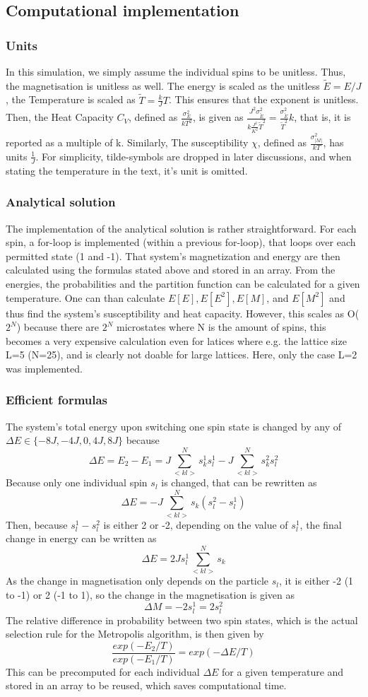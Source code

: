 \documentclass[10pt,a4paper]{article}
\begin{document}
\subsection{Computational implementation}

\subsubsection{Units}
In this simulation, we simply assume the individual spins to be unitless. Thus, the magnetisation is unitless as well.
The energy is scaled as the unitless $\tilde{E}=E/J$, the Temperature is scaled as  $\tilde{T}=\frac{k}{J}T$. This ensures that the exponent is unitless.
Then, the Heat Capacity $C_V$, defined as $\frac{\sigma_E^2}{kT^2}$, is given as $\frac{J^2\sigma^2_{\tilde{E}}}{k\frac{J^2}{K^2} \tilde{T}^2}=\frac{\sigma^2_{\tilde{E}}}{\tilde{T}^2}k$, that is, it is reported as a multiple of k. 
Similarly, The susceptibility $\chi$, defined as $\frac{\sigma_{|M|}^2}{kT}$, has units $\frac{1}{J}$. For simplicity, tilde-symbols are dropped in later discussions, and when stating the temperature in the text, it's unit is omitted.
\subsubsection{Analytical solution}
The implementation of the analytical solution is rather straightforward. For each spin, a for-loop is implemented (within a previous for-loop), that loops over each permitted state (1 and -1). That system's magnetization and energy are then calculated using the formulas stated above and stored in an array. From the energies, the probabilities and the partition function can be calculated for a given temperature. One can than calculate $E[E],E[E^2],E[M]$, and $E[M^2]$ and thus find the system's susceptibility and heat capacity. However, this scales as O($2^N$) because there are  $2^N$ microstates where N is the amount of spins, this becomes a very expensive calculation even for latices where e.g. the lattice size L=5 (N=25), and is clearly not doable for large lattices. Here, only the case L=2 was implemented.
\subsubsection{Efficient formulas}
The system's total energy upon switching one spin state is changed by any of $\Delta E \in \{-8J,-4J,0,4J,8J\}$ because 
$$\Delta E=E_2-E_1=J\sum_{<kl>}^Ns_k^1s_l^1-J\sum_{<kl>}^Ns_k^2s_l^2$$
Because only one individual spin $s_l$ is changed, that can be rewritten as 
$$\Delta E=-J\sum_{<kl>}^Ns_k(s_l^2-s_l^1)$$
Then, because $s_l^1-s_l^2$ is either 2 or -2, depending on the value of $s_l^1$, the final change in energy can be written as 
$$\Delta E=2Js_l^1\sum_{<kl>}^Ns_k$$
As the change in magnetisation only depends on the particle $s_l$, it is either -2 (1 to -1) or 2 (-1 to 1), so the change in the magnetisation is given as 
$$\Delta M=-2s_l^1=2s_l^2$$
The relative difference in probability between two spin states, which is the actual selection rule for the Metropolis algorithm, is then given by  
$$\frac{exp(-E_2/T)}{exp(-E_1/T)}=exp(-\Delta E/T)$$
This can be precomputed for each individual $\Delta E$ for a given temperature and stored in an array to be reused, which saves computational time. 
\end{document}
